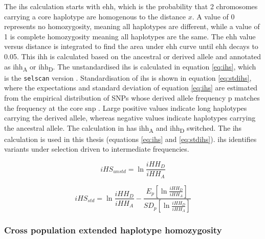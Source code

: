 \documentclass[]{report}
\begin{document}
The \gls{ihs} \citep{voight2006map, Szpiech2014} calculation starts with
\gls{ehh}, which is the probability that 2 chromosomes carrying a core
haplotype are homogenous to the distance \(x\). A value of 0 represents
no homozygosity, meaning all haplotypes are different, while a value of
1 is complete homozygosity meaning all haplotypes are the same. The
\gls{ehh} value versus distance is integrated to find the area under
\gls{ehh} curve until \gls{ehh} decays to 0.05. This \gls{ihh} is
calculated based on the ancestral or derived allele and annotated as
\gls{ihh}\textsubscript{A} or \gls{ihh}\textsubscript{D}. The
unstandardised \gls{ihs} is calculated in equation \eqref{eq:ihs}, which
is the \texttt{selscan} version \citep{Szpiech2014}. Standardisation of
\gls{ihs} is shown in equation \eqref{eq:stdihs}, where the expectations
and standard deviation of equation \eqref{eq:ihs} are estimated from the
empirical distribution of SNPs whose derived allele frequency p matches
the frequency at the core \gls{snp} \citep{voight2006map}. Large
positive values indicate long haplotypes carrying the derived allele,
whereas negative values indicate haplotypes carrying the ancestral
allele. The calculation in \citet{voight2006map} has
\gls{ihh}\textsubscript{A} and \gls{ihh}\textsubscript{D} switched. The
\citet{Szpiech2014} \gls{ihs} calculation is used in this thesis
(equations \eqref{eq:ihs} and \eqref{eq:stdihs}). \Gls{ihs} identifies
variants under selection driven to intermediate frequencies.

\begin{equation} 
iHS_{unstd} = \ln{\frac{iHH_D}{iHH_A}}
\label{eq:ihs}
\end{equation}

\begin{equation} 
iHS_{std} = \ln{\frac{iHH_D}{iHH_A}} - \frac{E_p [\ln{\frac{iHH_D}{iHH_A}}] }{ SD_p [\ln{\frac{iHH_D}{iHH_A}}] }
\label{eq:stdihs}
\end{equation}

\subsubsection{Cross population extended haplotype
homozygosity}\label{cross-population-extended-haplotype-homozygosity}
\end{document}
